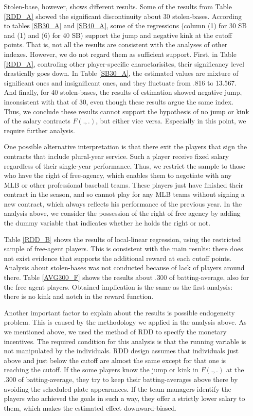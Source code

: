 \documentclass[dvipdfmx, 12pt]{article}
\begin{document}
Stolen-base, however, shows different results. Some of the results from Table \ref{RDD_A} showed the significant discontinuity about 30 stolen-bases. According to tables \ref{SB30_A} and \ref{SB40_A}, some of the regressions (column (1) for 30 SB and (1) and (6) for 40 SB) support the jump and negative kink at the cutoff points. That is, not all the results are consistent with the analyses of other indexes. However, we do not regard them as sufficient support. First, in Table \ref{RDD_A}, controling other player-specific charactarisitcs, their significancy level drastically goes down. In Table \ref{SB30_A}, the estimated values are mixture of significant ones and insignificant ones, and they fluctuate from .816 to 13.567. And finally, for 40 stolen-bases, the results of estimation showed negative jump, inconsistent with that of 30, even though these results argue the same index. Thus, we conclude these results cannot support the hypothesis of no jump or kink of the salary contracts $F(.,.)$, but either vice versa. Especially in this point, we require further analysis.

One possible alternative interpretation is that there exit the players that sign the contracts that include plural-year service. Such a player receive fixed salary regardless of their single-year performance. Thus, we restrict the sample to those who have the right of free-agency, which enables them to negotiate with any MLB or other professional baseball teams. These players just have finished their contract in the season, and so cannot play for any MLB teams without signing a new contract, which always reflects his performance of the previous year. In the analysis above, we consider the possession of the right of free agency by adding the dummy variable that indicates whether he holds the right or not.

Table \ref{RDD_B} shows the results of local-linear regression, using the restricted sample of free-agent players. This is consistent with the main results: there does not exist evidence that supports the additional reward at each cutoff points. Analysis about stolen-bases was not conducted because of lack of players around there. Table \ref{AVG300_F} shows the results about .300 of batting-average, also for the free agent players. Obtained implication is the same as the first analysis: there is no kink and notch in the reward function.

Another important factor to explain about the results is possible  endogeneity problem. This is caused by the methodology we applied in the analysis above. As we mentioned above, we used the method of RDD to specify the monetary incentives. The required condition for this analysis is that the running variable is not manipulated by the individuals. RDD design assumes that individuals just above and just below the cutoff are almost the same except for that one is reaching the cutoff. If the some players know the jump or kink in $F(.,.)$ at the .300 of batting-average, they try to keep their batting-averages above there by avoiding the scheduled plate-appearances. If the team managers identify the players who achieved the goals in such a way, they offer a strictly lower salary to them, which makes the estimated effect downward-biased.
\end{document}
